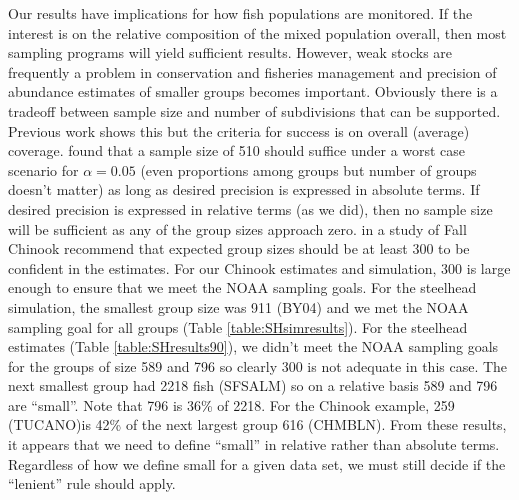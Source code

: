 \documentclass[12pt]{article}
\begin{document}
Our results have implications for how fish populations are monitored. If the interest is on the relative composition of the  mixed population overall, then most sampling programs will yield sufficient results. However, weak stocks are frequently a problem in conservation and fisheries management and precision of abundance estimates of smaller groups becomes important.  Obviously there is a tradeoff between sample size and number of subdivisions that can be supported. Previous work \cite{Gerritsen} shows this but the criteria for success is on overall (average) coverage.  found that a sample size of 510 should suffice under a worst case scenario for $\alpha=0.05$ (even proportions among groups but number of groups doesn't matter) as long as desired precision is expressed in absolute terms. If desired precision is expressed in relative terms (as we did), then no sample size will be sufficient as any of the group sizes approach zero.  in a study of Fall Chinook recommend that expected group sizes should be at least 300 to be confident in the estimates. For our Chinook estimates and simulation, 300 is large enough to ensure that we meet the NOAA sampling goals.  For the steelhead simulation, the smallest group size was 911 (BY04) and we met the NOAA sampling goal for all groups (Table \ref{table:SHsimresults}).  For the steelhead estimates (Table \ref{table:SHresults90}), we didn't meet the NOAA sampling goals for the groups of size 589 and 796 so clearly 300 is not adequate in this case. The next smallest group had 2218 fish (SFSALM) so on a relative basis 589 and 796 are ``small''.  Note that 796 is 36\% of 2218.  For the Chinook example, 259 (TUCANO)is 42\% of the next largest group 616 (CHMBLN).  From these results, it appears that we need to define ``small'' in relative rather than absolute terms.  Regardless of how we define small for a given data set, we must still decide if the ``lenient'' rule should apply.
\end{document}
